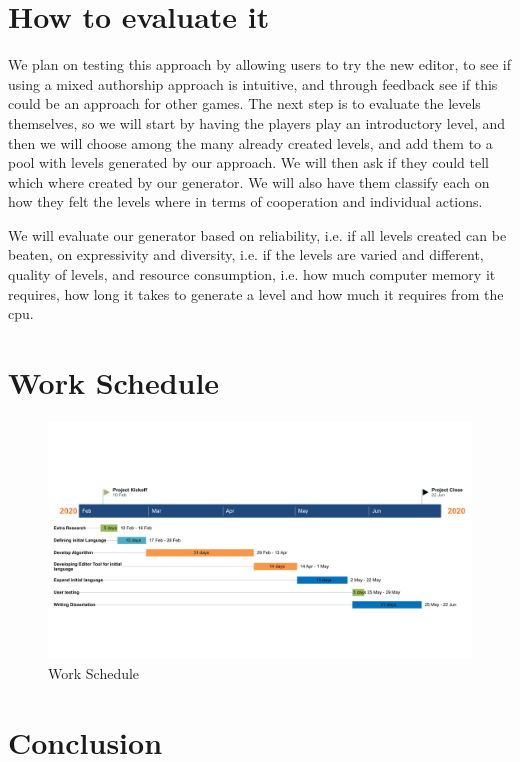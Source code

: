 \documentclass[runningheads]{llncs}
\begin{document}
\section{How to evaluate it}
We plan on testing this approach by allowing users to try the new editor, to see if using a mixed authorship approach is intuitive, and through feedback see if this could be an approach for other games. The next step is to evaluate the levels themselves, so we will start by having the players play an introductory level, and then we will choose among the many already created levels, and add them to a pool with levels generated by our approach. We will then ask if they could tell which where created by our generator. We will also have them classify each on how they felt the levels where in terms of cooperation and individual actions.

We will evaluate our generator based on reliability, i.e. if all levels created can be beaten, on expressivity and diversity, i.e. if the levels are varied and different, quality of levels, and resource consumption, i.e. how much computer memory it requires, how long it takes to generate a level and how much it requires from the cpu.

\section{Work Schedule}

\begin{figure}
    \centering
    \includegraphics[scale=0.109]{images/gantt.png}
    \caption{Work Schedule}
    \label{fig:gantt}
\end{figure}

\section{Conclusion}
\end{document}
